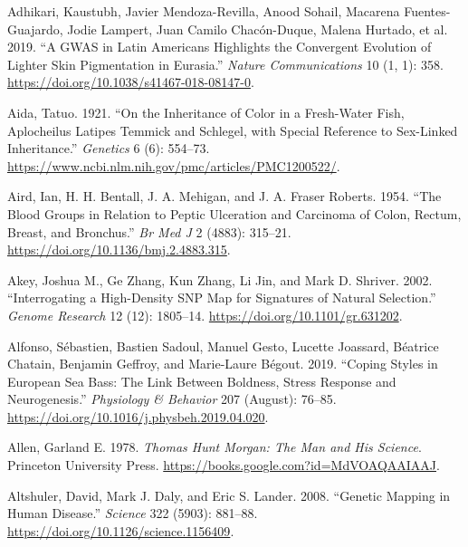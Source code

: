 \documentclass[
]{book}
\newlength{\cslhangindent}
\newlength{\cslentryspacingunit} %
\newenvironment{CSLReferences}[2] %
 {%
  \setlength{\parindent}{0pt}
  \ifodd #1
  \let\oldpar\par
  \def\par{\hangindent=\cslhangindent\oldpar}
  \fi
  \setlength{\parskip}{#2\cslentryspacingunit}
 }%
 {}
\begin{document}
\hypertarget{refs}{}
\begin{CSLReferences}{1}{0}
\leavevmode{}%
Adhikari, Kaustubh, Javier Mendoza-Revilla, Anood Sohail, Macarena Fuentes-Guajardo, Jodie Lampert, Juan Camilo Chacón-Duque, Malena Hurtado, et al. 2019. {``A {GWAS} in {Latin Americans} Highlights the Convergent Evolution of Lighter Skin Pigmentation in {Eurasia}.''} \emph{Nature Communications} 10 (1, 1): 358. \url{https://doi.org/10.1038/s41467-018-08147-0}.

\leavevmode{}%
Aida, Tatuo. 1921. {``On the {Inheritance} of {Color} in a {Fresh-Water Fish}, {Aplocheilus Latipes Temmick} and {Schlegel}, with {Special Reference} to {Sex-Linked Inheritance}.''} \emph{Genetics} 6 (6): 554--73. \url{https://www.ncbi.nlm.nih.gov/pmc/articles/PMC1200522/}.

\leavevmode{}%
Aird, Ian, H. H. Bentall, J. A. Mehigan, and J. A. Fraser Roberts. 1954. {``The {Blood Groups} in {Relation} to {Peptic Ulceration} and {Carcinoma} of {Colon}, {Rectum}, {Breast}, and {Bronchus}.''} \emph{Br Med J} 2 (4883): 315--21. \url{https://doi.org/10.1136/bmj.2.4883.315}.

\leavevmode{}%
Akey, Joshua M., Ge Zhang, Kun Zhang, Li Jin, and Mark D. Shriver. 2002. {``Interrogating a {High-Density SNP Map} for {Signatures} of {Natural Selection}.''} \emph{Genome Research} 12 (12): 1805--14. \url{https://doi.org/10.1101/gr.631202}.

\leavevmode{}%
Alfonso, Sébastien, Bastien Sadoul, Manuel Gesto, Lucette Joassard, Béatrice Chatain, Benjamin Geffroy, and Marie-Laure Bégout. 2019. {``Coping Styles in {European} Sea Bass: {The} Link Between Boldness, Stress Response and Neurogenesis.''} \emph{Physiology \& Behavior} 207 (August): 76--85. \url{https://doi.org/10.1016/j.physbeh.2019.04.020}.

\leavevmode{}%
Allen, Garland E. 1978. \emph{Thomas {Hunt Morgan}: {The Man} and {His Science}}. {Princeton University Press}. \url{https://books.google.com?id=MdVOAQAAIAAJ}.

\leavevmode{}%
Altshuler, David, Mark J. Daly, and Eric S. Lander. 2008. {``Genetic {Mapping} in {Human Disease}.''} \emph{Science} 322 (5903): 881--88. \url{https://doi.org/10.1126/science.1156409}.


\end{CSLReferences}
\end{document}
